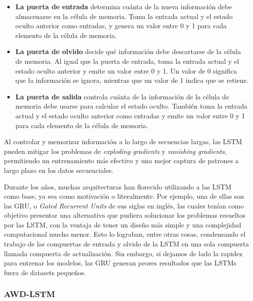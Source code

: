 \begin{itemize}
    \item \textbf{La puerta de entrada} determina cuánta de la nueva información debe almacenarse en la célula de memoria. Toma la entrada actual y el estado oculto anterior como entradas, y genera un valor entre 0 y 1 para cada elemento de la célula de memoria.
    \item \textbf{La puerta de olvido} decide qué información debe descartarse de la célula de memoria. Al igual que la puerta de entrada, toma la entrada actual y el estado oculto anterior y emite un valor entre 0 y 1. Un valor de 0 significa que la información se ignora, mientras que un valor de 1 indica que se retiene.
    \item \textbf{La puerta de salida} controla cuánta de la información de la célula de memoria debe usarse para calcular el estado oculto. También toma la entrada actual y el estado oculto anterior como entradas y emite un valor entre 0 y 1 para cada elemento de la célula de memoria.
\end{itemize}

Al controlar y memorizar información a lo largo de secuencias largas, las LSTM pueden mitigar los problemas de \textit{exploding gradients} y \textit{vanishing gradients}, permitiendo un entrenamiento más efectivo y una mejor captura de patrones a largo plazo en los datos secuenciales.

Durante los años, muchas arquitecturas han florecido utilizando a las LSTM como base, ya sea como motivación o literalmente. Por ejemplo, una de ellas son las GRU, o \textit{Gated Recurrent Units} de sus siglas en inglés, las cuales tenían como objetivo presentar una alternativa que pudiera solucionar los problemas resueltos por las LSTM, con la ventaja de tener un diseño más simple y una complejidad computacional mucho menor. Esto lo lograban, entre otras cosas, condensando el trabajo de las compuertas de entrada y olvido de la LSTM en una sola compuerta llamada compuerta de actualización. \parencite{chung2014empiricalevaluationgatedrecurrent} Sin embargo, si dejamos de lado la rapidez para entrenar los modelos, las GRU generan peores resultados que las LSTMs fuera de datasets pequeños. \parencite{lstmandgru}

\subsubsection{AWD-LSTM}

\label{sec:awd-lstm}

